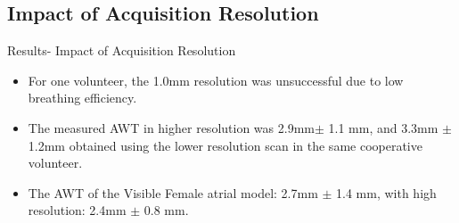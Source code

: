 \documentclass[aspectratio=43]{beamer}
\begin{document}
\newpage
\subsection{Impact of Acquisition Resolution}
\begin{frame}{ Results- Impact of Acquisition Resolution}
\begin{itemize}
\item For one volunteer, the 1.0mm resolution was unsuccessful due to low breathing efficiency. 
\item The measured AWT in higher resolution was 2.9mm\begin{math} \pm \end{math} 1.1 mm, and 3.3mm \begin{math} \pm \end{math} 1.2mm obtained using the lower resolution scan in the same cooperative volunteer.
\item The AWT of the Visible Female atrial model: 2.7mm \begin{math} \pm \end{math} 1.4 mm, with high resolution: 2.4mm \begin{math} \pm \end{math} 0.8 mm.

\end{itemize}

\end{frame}

\newpage
\end{document}
